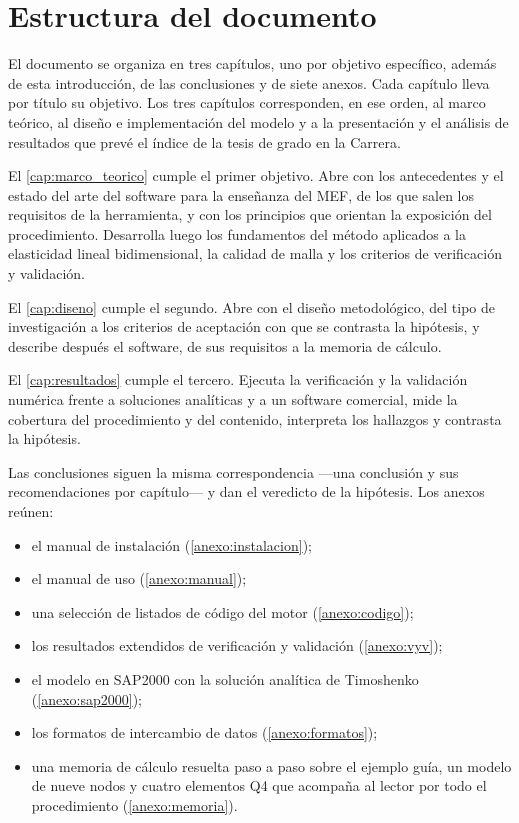 \section*{Estructura del documento}

El documento se organiza en tres capítulos, uno por objetivo específico, además de esta introducción, de las conclusiones y de siete anexos. Cada capítulo lleva por título su objetivo. Los tres capítulos corresponden, en ese orden, al marco teórico, al diseño e implementación del modelo y a la presentación y el análisis de resultados que prevé el índice de la tesis de grado en la Carrera.

El \autoref{cap:marco_teorico} cumple el primer objetivo. Abre con los antecedentes y el estado del arte del software para la enseñanza del MEF, de los que salen los requisitos de la herramienta, y con los principios que orientan la exposición del procedimiento. Desarrolla luego los fundamentos del método aplicados a la elasticidad lineal bidimensional, la calidad de malla y los criterios de verificación y validación.

El \autoref{cap:diseno} cumple el segundo. Abre con el diseño metodológico, del tipo de investigación a los criterios de aceptación con que se contrasta la hipótesis, y describe después el software, de sus requisitos a la memoria de cálculo.

El \autoref{cap:resultados} cumple el tercero. Ejecuta la verificación y la validación numérica frente a soluciones analíticas y a un software comercial, mide la cobertura del procedimiento y del contenido, interpreta los hallazgos y contrasta la hipótesis.

Las conclusiones siguen la misma correspondencia ---una conclusión y sus recomendaciones por capítulo--- y dan el veredicto de la hipótesis. Los anexos reúnen:
\begin{itemize}
    \item el manual de instalación (\autoref{anexo:instalacion});
    \item el manual de uso (\autoref{anexo:manual});
    \item una selección de listados de código del motor (\autoref{anexo:codigo});
    \item los resultados extendidos de verificación y validación (\autoref{anexo:vyv});
    \item el modelo en SAP2000 con la solución analítica de Timoshenko (\autoref{anexo:sap2000});
    \item los formatos de intercambio de datos (\autoref{anexo:formatos});
    \item una memoria de cálculo resuelta paso a paso sobre el ejemplo guía, un modelo de nueve nodos y cuatro elementos Q4 que acompaña al lector por todo el procedimiento (\autoref{anexo:memoria}).
\end{itemize}

